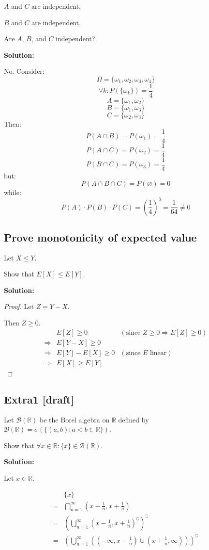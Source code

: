 \documentclass{article}
\begin{document}
\(A\) and \(C\) are independent.

\(B\) and \(C\) are independent.

Are \(A\), \(B\), and \(C\) independent?

\textbf{Solution:}

No. Consider:
\[\Omega = \{\omega_1,\omega_2,\omega_3,\omega_4\}\]
\[\forall k: P(\{\omega_k\}) = \frac14\]
\[A = \{\omega_1,\omega_2\}\]
\[B = \{\omega_1,\omega_3\}\]
\[C = \{\omega_2,\omega_3\}\]
Then:
\[P(A \cap B) = P(\omega_1)=\frac14\]
\[P(A \cap C) = P(\omega_2)=\frac14\]
\[P(B \cap C) = P(\omega_3)=\frac14\]
but:
\[P(A\cap B \cap C) = P(\varnothing)=0\]
while:
\[P(A)\cdot P(B) \cdot P(C) = (\frac{1}{4})^3=\frac{1}{64}\neq 0\]

\subsection{Prove monotonicity of expected value}
Let \(X\leq Y\).

Show that \(E[X]\leq E[Y]\).

\textbf{Solution:}

\begin{proof}
Let \(Z=Y-X\).

Then \(Z\geq 0\).
\begin{align*}
     & E[Z]\geq 0 & (\text{since }Z\geq 0 \Rightarrow E[Z]\geq 0) \\
    \Rightarrow& E[Y-X] \geq 0 \\
    \Rightarrow& E[Y]-E[X] \geq 0 & (\text{since }E\text{ linear}) \\
    \Rightarrow& E[X]\geq E[Y]
\end{align*}
\end{proof}

\subsection{Extra1 [draft]}

Let \(\mathcal{B}(\mathbb{R})\) be the Borel algebra on \(\mathbb{R}\)
defined by \(\mathcal{B}(\mathbb{R})=\sigma(\{(a,b): a<b \in \mathbb{R}\})\).

Show that \(\forall x \in \mathbb{R}:\{x\}\in \mathcal{B}(\mathbb{R})\).

\textbf{Solution:}

Let \(x\in \mathbb{R}\).

\begin{align*}
     & \{x\} \\
    =& \bigcap_{n=1}^\infty (x-\frac{1}{n}, x+\frac{1}{n}) \\
    =& \left(\bigcup_{n=1}^\infty (x-\frac{1}{n}, x+\frac{1}{n})^\complement\right)^\complement \\
    =& \left(\bigcup_{n=1}^\infty\left( (-\infty,x-\frac{1}{n})\cup (x+\frac{1}{n}      ,\infty) \right)\right)^\complement \\
\end{align*}
\end{document}
